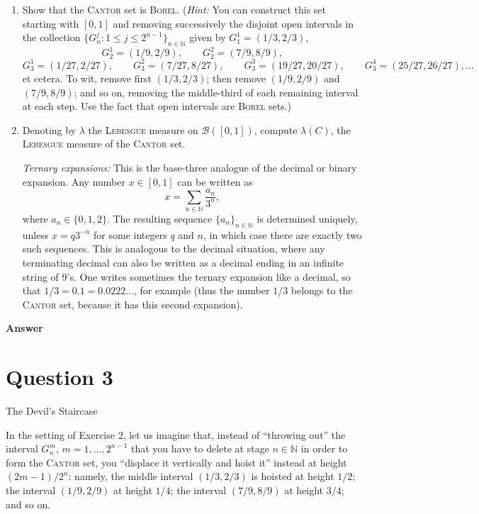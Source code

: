 \documentclass[letterpaper]{article}
\begin{document}
	\begin{enumerate}
		\item[(a)] Show that the \textsc{Cantor} set is \textsc{Borel}.
		(\textit{Hint:} You can construct this set starting with $[0,1]$ and removing
		successively the disjoint open intervals in the collection
		$\{G_n^j : 1 \le j \le 2^{n-1}\}_{n\in\mathbb{N}}$ given by
		$G_1^1 = (1/3,2/3)$,
		\[
		G_2^1 = (1/9,2/9), \qquad G_2^2 = (7/9,8/9),
		\]
		\[
		G_3^1 = (1/27,2/27), \qquad G_3^2 = (7/27,8/27), \qquad
		G_3^3 = (19/27,20/27), \qquad G_3^4 = (25/27,26/27), \ldots
		\]
		et cetera. To wit, remove first $(1/3,2/3)$; then remove $(1/9,2/9)$ and
		$(7/9,8/9)$; and so on, removing the middle-third of each remaining interval at
		each step. Use the fact that open intervals are \textsc{Borel} sets.)
		
		\item[(b)] Denoting by $\lambda$ the \textsc{Lebesgue} measure on $\mathcal{B}([0,1])$,
		compute $\lambda(C)$, the \textsc{Lebesgue} measure of the \textsc{Cantor} set.
		
		\textit{Ternary expansions:}
		This is the base-three analogue of the decimal or binary expansion.
		Any number $x \in [0,1]$ can be written as
		\[
		x = \sum_{n\in\mathbb{N}} \frac{a_n}{3^n},
		\]
		where $a_n \in \{0,1,2\}$.
		The resulting sequence $\{a_n\}_{n\in\mathbb{N}}$ is determined uniquely,
		unless $x = q3^{-n}$ for some integers $q$ and $n$, in which case there are
		exactly two such sequences. This is analogous to the decimal situation,
		where any terminating decimal can also be written as a decimal ending in
		an infinite string of 9's. One writes sometimes the ternary expansion like
		a decimal, so that $1/3 = 0.1 = 0.0222\ldots$, for example (thus the number
		$1/3$ belongs to the \textsc{Cantor} set, because it has this second
		expansion).
		
	\end{enumerate}
	
			
		\textbf{Answer}
		
		\clearpage
		
		\section{Question 3}
		
		{\color{deepred} The Devil's Staircase}
		
		In the setting of Exercise 2, let us imagine that, instead of ``throwing out''
		the interval $G_n^m$, $m = 1,\ldots,2^{n-1}$ that you have to delete at stage
		$n \in \mathbb{N}$ in order to form the \textsc{Cantor} set, you ``displace it
		vertically and hoist it'' instead at height $(2m-1)/2^n$: namely, the middle
		interval $(1/3,2/3)$ is hoisted at height $1/2$; the interval $(1/9,2/9)$ at
		height $1/4$; the interval $(7/9,8/9)$ at height $3/4$; and so on.
		
\end{document}
